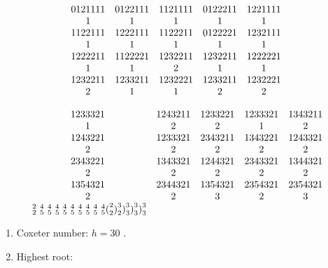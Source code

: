 \[
\begin{array}{c c c c c} 0   1   2   1   1   1   1 & 0   1   2   2   1   1   1 & 1   1   2   1   1   1   1 & 0   1   2   2   2   1   1 & 1   2   2   1   1   1   1 \\ 1 & 1 & 1 & 1 & 1 \\ 1   1   2   2   1   1   1 & 1   2   2   2   1   1   1 & 1   1   2   2   2   1   1 & 0   1   2   2   2   2   1 & 1   2   3   2   1   1   1 \\ 1 & 1 & 1 & 1 & 1 \\ 1   2   2   2   2   1   1 & 1   1   2   2   2   2   1 & 1   2   3   2   2   1   1 & 1   2   3   2   2   1   1 & 1   2   2   2   2   2   1 \\ 1 & 1 & 2 & 1 & 1 \\ 1   2   3   2   2   1   1 & 1   2   3   3   2   1   1 & 1   2   3   2   2   2   1 & 1   2   3   3   2   1   1 & 1   2   3   2   2   2   1 \\ 2 & 1 & 1 & 2 & 2 \end{array}
\]

\[
\begin{array}{c c c c c} 1   2   3   3   3   2   1 & 1   2   4   3   2   1   1 & 1   2   3   3   2   2   1 & 1   2   3   3   3   2   1 & 1   3   4   3   2   1   1 \\ 1 & 2 & 2 & 1 & 2 \\ 1   2   4   3   2   2   1 & 1   2   3   3   3   2   1 & 2   3   4   3   2   1   1 & 1   3   4   3   2   2   1 & 1   2   4   3   3   2   1 \\ 2 & 2 & 2 & 2 & 2 \\ 2   3   4   3   2   2   1 & 1   3   4   3   3   2   1 & 1   2   4   4   3   2   1 & 2   3   4   3   3   2   1 & 1   3   4   4   3   2   1 \\ 2 & 2 & 2 & 2 & 2 \\ 1   3   5   4   3   2   1 & 2   3   4   4   3   2   1 & 1   3   5   4   3   2   1 & 2   3   5   4   3   2   1 & 2   3   5   4   3   2   1 \\ 2 & 2 & 3 & 2 & 3 \\ \text { } _ {2} ^ {2} \text { } _ {5} ^ {4} \text { } _ {5} ^ {4} \text { } _ {5} ^ {4} \text { } _ {5} ^ {4} \text { } _ {5} ^ {4} \text { } _ {5} ^ {4} \text { } _ {5} ^ {4} \text { } _ {5} ^ {4} \text { } _ {5} ^ {4} \text {(} _ {2} ^ {2} \text {)} _ {2} ^ {3} \text {)} _ {3} ^ {3} \text {)} _ {3} ^ {3} \text {)} _ {3} ^ {3} \end{array}
\]

\begin{enumerate}
\def\labelenumi{(\Roman{enumi})}
\setcounter{enumi}{2}
\item
  Coxeter number: \(h = 30\) .
\item
  Highest root:
\end{enumerate}

